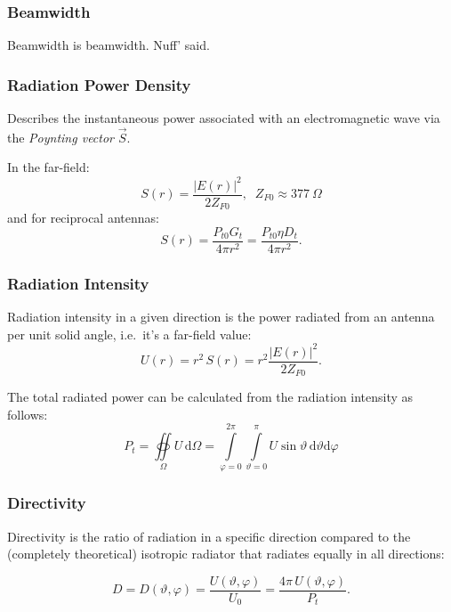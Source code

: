 \subsubsection{Beamwidth}
Beamwidth is beamwidth. Nuff' said.

\subsubsection{Radiation Power Density}
Describes the instantaneous power associated with an electromagnetic wave via the \textit{Poynting vector} $\vec{S}$.

\noindent In the far-field:
\begin{equation*}
    S(r) = \dfrac{|E(r)|^2}{2 Z_{F0}},\;\; Z_{F0} \approx \SI{377}{\Omega}
\end{equation*}
and for reciprocal antennas:
\begin{equation*}
    S(r) = \dfrac{P_{t0}G_t}{4\pi r^2} = \dfrac{P_{t0}\eta D_t}{4\pi r^2}.
\end{equation*}

\subsubsection{Radiation Intensity}
Radiation intensity in a given direction is the power radiated from an antenna per unit solid angle, i.e.\ it's a far-field value:
\begin{equation*}
  U(r) = r^{2}\,S(r) = r^{2} \dfrac{{|E(r)|}^{2}}{2 Z_{F0}}.
\end{equation*}

The total radiated power can be calculated from the radiation intensity as follows:
\begin{equation*}
  P_{t} = \oiint\limits_{\Omega} U \,\mathrm{d}\Omega = \int\limits_{\varphi=0}^{2\pi} \int\limits_{\vartheta=0}^{\pi} U \sin\vartheta \, \mathrm{d}\vartheta\mathrm{d}\varphi
\end{equation*}

\subsubsection{Directivity}
Directivity is the ratio of radiation in a specific direction compared to the (completely theoretical) isotropic radiator that radiates equally in all directions:

\begin{equation*}
 D = D(\vartheta, \varphi) = \dfrac{U(\vartheta, \varphi)}{U_{0}} = \dfrac{4\pi\,U(\vartheta, \varphi)}{P_{t}}.
\end{equation*}

